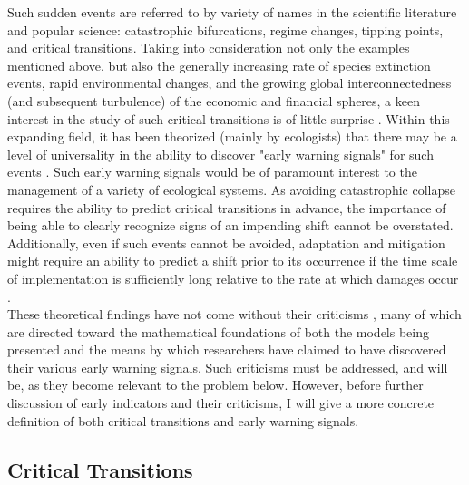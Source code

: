 \documentclass[12pt]{article}
\begin{document}
Such sudden events are referred to by variety of names in the scientific literature and popular science: catastrophic bifurcations, regime changes, tipping points, and critical transitions. Taking into consideration not only the examples mentioned above, but also the generally increasing rate of species extinction events, rapid environmental changes, and the growing global interconnectedness (and subsequent turbulence) of the economic and financial spheres, a keen interest in the study of such critical transitions is of little surprise \cite{Scheffer2009a,Dakos2013a}. Within this expanding field, it has been theorized (mainly by ecologists) that there may be a level of universality in the ability to discover "early warning signals" for such events \cite{Scheffer2001,Drake2010,Dakos2012,Wang2012,Carpenter2011,Chisholm2009,Scheffer2012}. Such early warning signals would be of paramount interest to the management of a variety of ecological systems. As avoiding catastrophic collapse requires the ability to predict critical transitions in advance, the importance of being able to clearly recognize signs of an impending shift cannot be overstated. Additionally, even if such events cannot be avoided, adaptation and mitigation might require an ability to predict a shift prior to its occurrence if the time scale of implementation is sufficiently long relative to the rate at which damages occur \cite{Boettiger2013}. \\

These theoretical findings  have not come without their criticisms \cite{Boerlijst2013}\cite{Boettiger2013a}\cite{Hastings2010}, many of which are directed toward the mathematical foundations of both the models being presented and the means by which researchers have claimed to have discovered their various early warning signals. Such criticisms must be addressed, and will be, as they become relevant to the problem below. However, before further discussion of early indicators and their criticisms, I will give a more concrete definition of both critical transitions and early warning signals.

\subsection{Critical Transitions}
\end{document}
